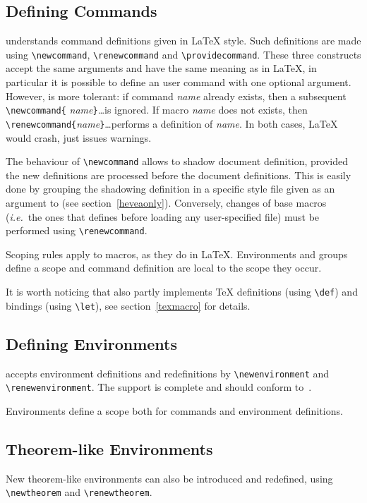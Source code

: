 \subsection{Defining Commands}\label{usermacro}

\hevea{} understands command definitions given in \LaTeX{} style. Such
definitions are made using
\verb+\newcommand+, \verb+\renewcommand+ and \verb+\providecommand+.
These three constructs accept the same arguments and have the same
meaning as in \LaTeX{}, in particular it is possible to define an user
command with one optional argument.
However, \hevea{} is more tolerant: if command
{\it name} already exists, then a subsequent \verb+\newcommand{+{\it
name}\verb+}+\ldots is ignored.  If macro {\it name} does not exists, then
\verb+\renewcommand{+{\it name}\verb+}+\ldots performs{} a definition of {\it
name}.  In both cases, \LaTeX{} would crash, \hevea{} just issues
warnings.

The behaviour of \verb+\newcommand+ allows to shadow document
definition, provided the new definitions are processed before the
document definitions.
This is easily done by grouping the shadowing definition  in a
specific style file given as an argument to \hevea{} (see section~\ref{heveaonly}).
Conversely, changes of base macros (\emph{i.e.}\ the ones that \hevea{}
defines before loading any user-specified file) must be performed
using \verb+\renewcommand+.



Scoping rules apply to macros, as they do in \LaTeX{}.
Environments and groups define a scope and command definition
are local to the scope they occur.

It is worth noticing that \hevea{} also partly implements \TeX{} definitions
(using \verb+\def+) and bindings (using \verb+\let+), see
section~\ref{texmacro} for details.


\subsection{Defining Environments}
\hevea{} accepts environment definitions and redefinitions
by \verb+\newenvironment+ and \verb+\renewenvironment+.
The support is complete and should conform
to~\cite[Sections~C.8.2]{latex}.


Environments define a scope both for commands and environment
definitions.


\subsection{Theorem-like Environments}
New theorem-like environments can also be introduced and redefined,
using \verb+\newtheorem+ and \verb+\renewtheorem+.

